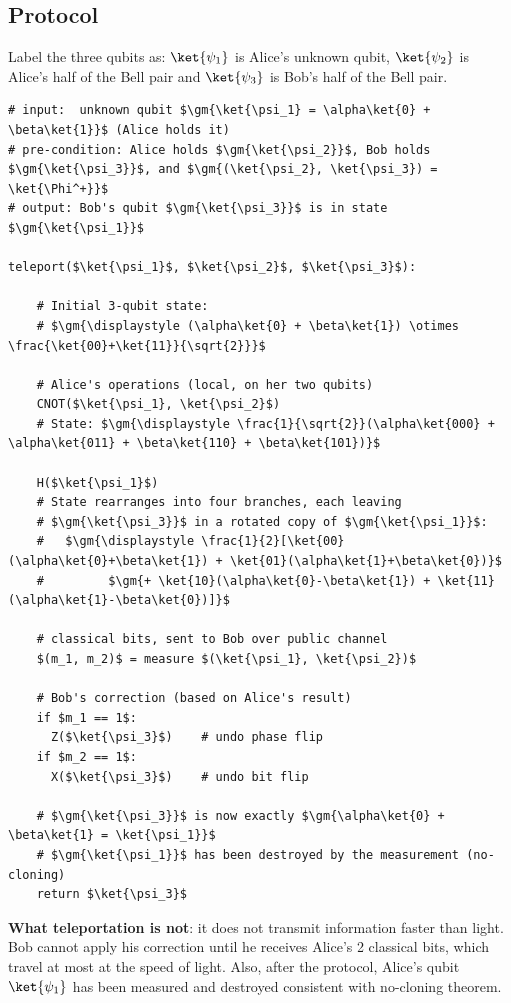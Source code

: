 \documentclass[oneside]{academica}
\begin{document}
\subsection{Protocol}

Label the three qubits as: $\ket{\psi_1}$ is Alice's unknown qubit, $\ket{\psi_2}$ is Alice's half of the Bell pair and $\ket{\psi_3}$ is Bob's half of the Bell pair.

\begin{lstlisting}
# input:  unknown qubit $\gm{\ket{\psi_1} = \alpha\ket{0} + \beta\ket{1}}$ (Alice holds it)
# pre-condition: Alice holds $\gm{\ket{\psi_2}}$, Bob holds $\gm{\ket{\psi_3}}$, and $\gm{(\ket{\psi_2}, \ket{\psi_3}) = \ket{\Phi^+}}$
# output: Bob's qubit $\gm{\ket{\psi_3}}$ is in state $\gm{\ket{\psi_1}}$

teleport($\ket{\psi_1}$, $\ket{\psi_2}$, $\ket{\psi_3}$):

    # Initial 3-qubit state:
    # $\gm{\displaystyle (\alpha\ket{0} + \beta\ket{1}) \otimes \frac{\ket{00}+\ket{11}}{\sqrt{2}}}$

    # Alice's operations (local, on her two qubits)
    CNOT($\ket{\psi_1}, \ket{\psi_2}$)
    # State: $\gm{\displaystyle \frac{1}{\sqrt{2}}(\alpha\ket{000} + \alpha\ket{011} + \beta\ket{110} + \beta\ket{101})}$

    H($\ket{\psi_1}$)
    # State rearranges into four branches, each leaving
    # $\gm{\ket{\psi_3}}$ in a rotated copy of $\gm{\ket{\psi_1}}$:
    #   $\gm{\displaystyle \frac{1}{2}[\ket{00}(\alpha\ket{0}+\beta\ket{1}) + \ket{01}(\alpha\ket{1}+\beta\ket{0})}$
    #         $\gm{+ \ket{10}(\alpha\ket{0}-\beta\ket{1}) + \ket{11}(\alpha\ket{1}-\beta\ket{0})]}$
    
    # classical bits, sent to Bob over public channel
    $(m_1, m_2)$ = measure $(\ket{\psi_1}, \ket{\psi_2})$

    # Bob's correction (based on Alice's result)
    if $m_1 == 1$:
      Z($\ket{\psi_3}$)    # undo phase flip
    if $m_2 == 1$:
      X($\ket{\psi_3}$)    # undo bit flip

    # $\gm{\ket{\psi_3}}$ is now exactly $\gm{\alpha\ket{0} + \beta\ket{1} = \ket{\psi_1}}$
    # $\gm{\ket{\psi_1}}$ has been destroyed by the measurement (no-cloning)
    return $\ket{\psi_3}$
\end{lstlisting}

\begin{note}
  \textbf{What teleportation is not}: it does not transmit information faster than light.
  Bob cannot apply his correction until he receives Alice's 2 classical bits, which travel at most at the speed of light.
  Also, after the protocol, Alice's qubit $\ket{\psi_1}$ has been measured and destroyed consistent with no-cloning theorem.
\end{note}
\end{document}
